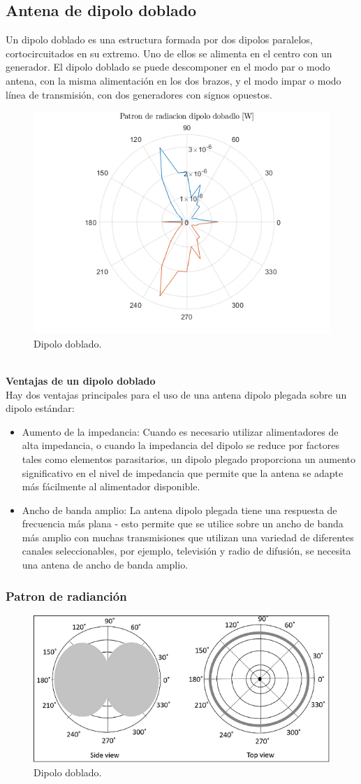 \documentclass[12pt,letterpaper]{article}
\begin{document}
\subsection{Antena de dipolo doblado}
Un dipolo doblado es una estructura formada por dos dipolos
paralelos, cortocircuitados en su extremo. Uno de ellos se alimenta
en el centro con un generador.
El dipolo doblado se puede descomponer en el modo par o modo
antena, con la misma alimentación en los dos brazos, y el modo
impar o modo línea de transmisión, con dos generadores con signos
opuestos.
\begin{figure}[ht]
    \centering
    \includegraphics[width=.4\textwidth]{f5.png}
    \caption{Dipolo doblado.}
\end{figure}
\\
\textbf{Ventajas de un dipolo doblado}
\\
Hay dos ventajas principales para el uso de una antena dipolo plegada sobre un dipolo estándar:
\begin{itemize}
    \item Aumento de la impedancia:   Cuando es necesario utilizar alimentadores de alta impedancia, 
    o cuando la impedancia del dipolo se reduce por factores tales como elementos parasitarios, 
    un dipolo plegado proporciona un aumento significativo en el nivel de impedancia que permite 
    que la antena se adapte más fácilmente al alimentador disponible.
    \item Ancho de banda amplio: La antena dipolo plegada tiene una respuesta de frecuencia más plana - 
    esto permite que se utilice sobre un ancho de banda más amplio con muchas transmisiones que 
    utilizan una variedad de diferentes canales seleccionables, por ejemplo, televisión y radio 
    de difusión, se necesita una antena de ancho de banda amplio.
\end{itemize}

\subsubsection{Patron de radianción}
\begin{figure}[ht]
    \centering
    \includegraphics[width=.5\textwidth]{f6.jpg}
    \caption{Dipolo doblado.}
\end{figure}
\end{document}
